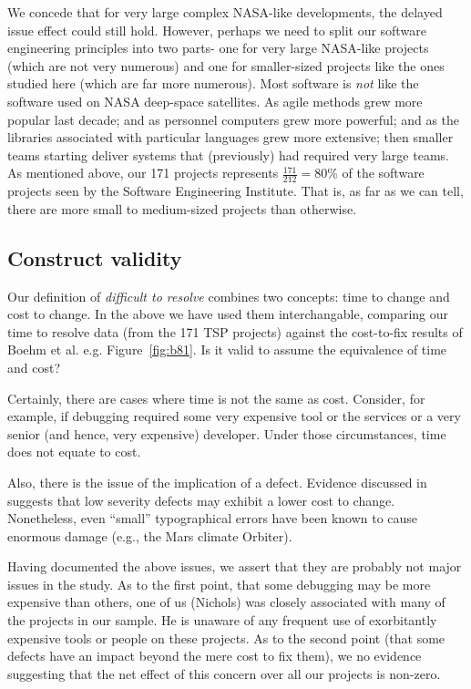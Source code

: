 \documentclass{sig-alternate}
\newcommand{\fig}[1]{Figure~\ref{fig:#1}}
\begin{document}
We concede that for very large complex NASA-like developments, the delayed issue
effect could still hold. However, perhaps we need to split our software engineering principles
into two parts- one for   very large NASA-like projects (which are not very numerous)
and one for smaller-sized projects like the ones studied here (which are far more numerous).
Most software is {\em not} like the software used on NASA deep-space satellites.
As  agile methods grew more popular last decade; and as personnel computers grew more powerful;
and as the libraries associated with particular languages grew more extensive; then smaller
teams starting  deliver systems that (previously) had required very large teams.
As mentioned above,
our  171 projects represents $\frac{171}{212}=80$\% of the software projects
seen by the Software Engineering Institute. That is, as far as we can tell,
there are more small to medium-sized projects than otherwise.


\subsection{Construct validity} 

Our definition of {\em difficult to resolve} combines two concepts: time to change and cost to
change. In the above we have used them interchangable, comparing our time to resolve data (from the 171 TSP projects) against the cost-to-fix results of Boehm et al. e.g. \fig{b81}.
Is it valid to assume the equivalence of time and cost?

Certainly, there are cases where time is not the same as cost. Consider, for example,
if debugging required some very expensive tool or the services or a very senior (and hence, very expensive)
developer. Under those circumstances, time does not equate to cost.

Also, there is the issue of the implication of  a defect. Evidence discussed in \cite{Shull02} suggests that low severity defects may exhibit a lower cost to change. Nonetheless, even ``small'' typographical errors have been known to cause enormous damage (e.g., the Mars climate Orbiter). 

Having documented the above issues, we assert that they are probably not major issues in the study.
As to the first point, that some debugging may be more expensive than others, one of us (Nichols)
was closely associated with many of the projects in our sample. He is unaware of any frequent
use of exorbitantly expensive tools or people on these projects. As to the second point (that
some defects have an impact beyond the mere cost to fix them), we no evidence suggesting
that the net effect of this concern over all our projects is non-zero.
\end{document}
